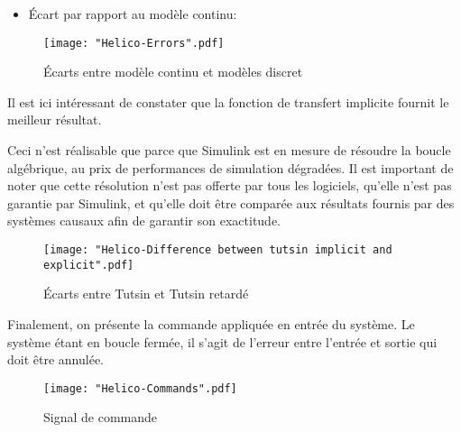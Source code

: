 \documentclass[a4paper,12pt,fleqn]{article}
\begin{document}
\begin{enumerate}
\newpage
\begin{itemize}
  \item Écart par rapport au modèle continu:
\end{itemize}

\begin{figure}[htb]
\centering
    \texttt{[image: "Helico-Errors".pdf]}
    \caption{Écarts entre modèle continu et modèles discret}
\end{figure}
\FloatBarrier

Il est ici intéressant de constater que la fonction de transfert implicite fournit le meilleur résultat.

Ceci n'est réalisable que parce que Simulink est en mesure de résoudre la boucle algébrique, au prix de performances de simulation dégradées. Il est important de noter que cette résolution n'est pas offerte par tous les logiciels, qu'elle n'est pas garantie par Simulink, et qu'elle doit être comparée aux résultats fournis par des systèmes causaux afin de garantir son exactitude.

\begin{figure}[htb]
\centering
    \texttt{[image: "Helico-Difference between tutsin implicit and explicit".pdf]}
    \caption{Écarts entre Tutsin et Tutsin retardé}
\end{figure}
\FloatBarrier

Finalement, on présente la commande appliquée en entrée du système. Le système étant en boucle fermée, il s'agit de l'erreur entre l'entrée et sortie qui doit être annulée.

\begin{figure}[htb]
\centering
    \texttt{[image: "Helico-Commands".pdf]}
    \caption{Signal de commande}
\end{figure}
\FloatBarrier

\end{enumerate}

\pagebreak[4]
\newpage
\end{document}
